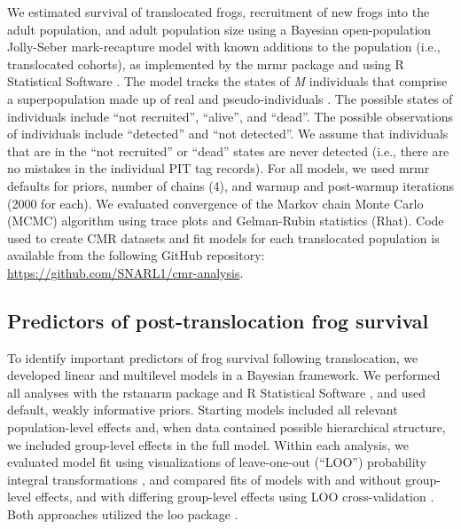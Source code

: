 \documentclass[9pt,twocolumn,twoside,lineno]{pnas-new}
\begin{document}
{We estimated survival of translocated frogs, recruitment of new frogs
into the adult population, and adult population size using a Bayesian
open-population Jolly-Seber mark-recapture model with known additions to
the population (i.e., translocated cohorts), as implemented by the mrmr
package \citep{joseph2019} and using R Statistical Software
\citep[v4.4.4,][]{rsoftware2022}. The model tracks the states of
\emph{M} individuals that comprise a superpopulation made up of real and
pseudo-individuals \citep[see][ for details]{joseph2018}. The possible
states of individuals include ``not recruited'', ``alive'', and
``dead''. The possible observations of individuals include ``detected''
and ``not detected''. We assume that individuals that are in the ``not
recruited'' or ``dead'' states are never detected (i.e., there are no
mistakes in the individual PIT tag records). For all models, we used
mrmr defaults for priors, number of chains (4), and warmup and
post-warmup iterations (2000 for each). We evaluated convergence of the
Markov chain Monte Carlo (MCMC) algorithm using trace plots and
Gelman-Rubin statistics (Rhat). Code used to create CMR datasets and fit
models for each translocated population is available from the following
GitHub repository:
\href{https://github.com/SNARL1/cmr-analysis.}{https://github.com/SNARL1/cmr-analysis}.

\hypertarget{predictors-of-post-translocation-frog-survival}{%
\subsection*{Predictors of post-translocation frog
survival}\label{predictors-of-post-translocation-frog-survival}}

To identify important predictors of frog survival following
translocation, we developed linear and multilevel models in a Bayesian
framework. We performed all analyses with the rstanarm package
\citep{rstanarm2022} and R Statistical Software
\citep[v4.4.4,][]{rsoftware2022}, and used default, weakly informative
priors. Starting models included all relevant population-level effects
and, when data contained possible hierarchical structure, we included
group-level effects in the full model. Within each analysis, we
evaluated model fit using visualizations of leave-one-out (``LOO'')
probability integral transformations \citep{gelman2013, gabry2019}, and
compared fits of models with and without group-level effects, and with
differing group-level effects using LOO cross-validation
\citep{vehtari2016}. Both approaches utilized the loo package
\citep{vehtari2022}.

}
\end{document}
